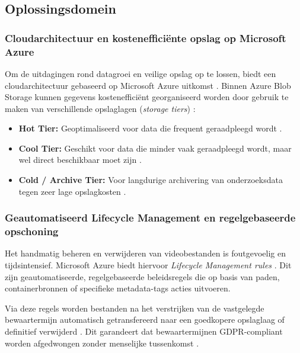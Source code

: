\subsection{Oplossingsdomein}%
\label{subsec:lit_oplossingsdomein}

\subsubsection{Cloudarchitectuur en kostenefficiënte opslag op Microsoft Azure}
Om de uitdagingen rond datagroei en veilige opslag op te lossen, biedt een cloudarchitectuur gebaseerd op Microsoft Azure uitkomst \parencite{AzureWellArchitected2026}. Binnen Azure Blob Storage kunnen gegevens kostenefficiënt georganiseerd worden door gebruik te maken van verschillende opslaglagen (\emph{storage tiers}) \parencite{AzureLifecycle2026}:
\begin{itemize}
    \item \textbf{Hot Tier:} Geoptimaliseerd voor data die frequent geraadpleegd wordt \parencite{AzureLifecycle2026}.
    \item \textbf{Cool Tier:} Geschikt voor data die minder vaak geraadpleegd wordt, maar wel direct beschikbaar moet zijn \parencite{AzureLifecycle2026}.
    \item \textbf{Cold / Archive Tier:} Voor langdurige archivering van onderzoeksdata tegen zeer lage opslagkosten \parencite{AzureWellArchitected2026}.
\end{itemize}

\subsubsection{Geautomatiseerd Lifecycle Management en regelgebaseerde opschoning}
Het handmatig beheren en verwijderen van videobestanden is foutgevoelig en tijdsintensief. Microsoft Azure biedt hiervoor \emph{Lifecycle Management rules} \parencite{AzureLifecycle2026}. Dit zijn geautomatiseerde, regelgebaseerde beleidsregels die op basis van paden, containerbronnen of specifieke metadata-tags acties uitvoeren.

Via deze regels worden bestanden na het verstrijken van de vastgelegde bewaartermijn automatisch getransfereerd naar een goedkopere opslaglaag of definitief verwijderd \parencite{AzureLifecycle2026}. Dit garandeert dat bewaartermijnen GDPR-compliant worden afgedwongen zonder menselijke tussenkomst \parencite{AzureWellArchitected2026}.


